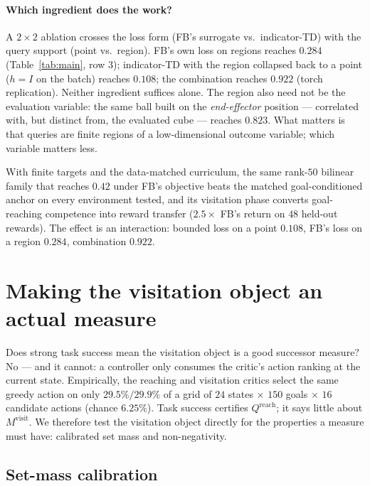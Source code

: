 \documentclass{article}
\newcommand{\Reach}{\mathrm{reach}}
\newcommand{\Visit}{\mathrm{visit}}
\begin{document}
\paragraph{Which ingredient does the work?}
A $2\times2$ ablation crosses the loss form (FB's surrogate vs.\ indicator-TD)
with the query support (point vs.\ region). FB's own loss on regions reaches
$0.284$ (Table~\ref{tab:main}, row 3); indicator-TD with the region collapsed
back to a point ($h=I$ on the batch) reaches $0.108$; the combination reaches
$0.922$ (torch replication). Neither ingredient suffices alone. The region also
need not be the evaluation variable: the same ball built on the
\emph{end-effector} position --- correlated with, but distinct from, the
evaluated cube --- reaches $0.823$. What matters is that queries are finite
regions of a low-dimensional outcome variable; which variable matters less.

\begin{finding}
With finite targets and the data-matched curriculum, the same rank-$50$
bilinear family that reaches $0.42$ under FB's objective beats the matched
goal-conditioned anchor on every environment tested, and its visitation phase
converts goal-reaching competence into reward transfer ($2.5\times$ FB's
return on $48$ held-out rewards). The effect is an interaction: bounded loss on
a point $0.108$, FB's loss on a region $0.284$, combination $0.922$.
\end{finding}

\section{Making the visitation object an actual measure}
\label{sec:measure-validity}

Does strong task success mean the visitation object is a good successor
measure? No --- and it cannot: a controller only consumes the critic's action
ranking at the current state. Empirically, the reaching and visitation critics
select the same greedy action on only $29.5\%/29.9\%$ of a grid of $24$ states
$\times$ $150$ goals $\times$ $16$ candidate actions (chance $6.25\%$). Task
success certifies $Q^{\Reach}$; it says little about $M^{\Visit}$. We therefore
test the visitation object directly for the properties a measure must have:
calibrated set mass and non-negativity.

\subsection{Set-mass calibration}
\label{sec:set-calibration}
\end{document}
